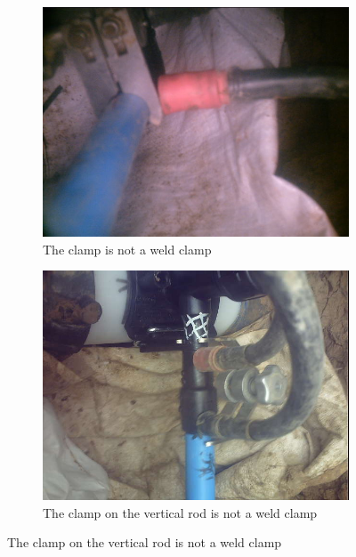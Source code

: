 \documentclass[a4paper,11pt]{article}
\begin{document}
\begin{figure}
    \centering
    \begin{minipage}[b]{\textwidth}
      \begin{subfigure}{.5\textwidth} 
        \centering
        \includegraphics[scale=0.3]{images/truly_confusing_1.jpg}
        \caption{The clamp is not a weld clamp}\label{fig:2a}
      \end{subfigure}%
      \begin{subfigure}{.5\textwidth} 
        \centering
        \includegraphics[scale=0.3]{images/truly_confusing_2.jpg}
        \caption{The clamp on the vertical rod is not a weld clamp}\label{fig:2b}
      \end{subfigure} \par \vspace*{20pt} %
    \end{minipage}%
\end{figure}
\end{document}
